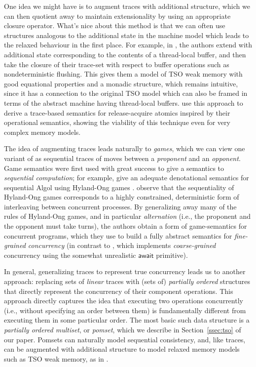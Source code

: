 \documentclass[acmsmall,screen,review]{acmart}
\newcommand{\ms}[1]{\ensuremath{\mathsf{#1}}}
\begin{document}
One idea we might have is to augment traces with additional structure, which we can then quotient
away to maintain extensionality by using an appropriate closure operator. What's nice about this
method is that we can often use structures analogous to the additional state in the machine model
which leads to the relaxed behaviour in the first place. For example, in
\citet{jagadeesan-brookes-relaxed-12}, the authors extend \citet{brookes-full-abstraction-96} with
additional state corresponding to the contents of a thread-local buffer, and then take the closure
of their trace-set with respect to buffer operations such as nondeterministic flushing. This gives
them a model of TSO weak memory with good equational properties and a monadic structure, which
remains intuitive, since it has a connection to the original TSO model which can also be framed in
terms of the abstract machine having thread-local buffers. \citet{release-acquire} use this approach
to derive a trace-based semantics for release-acquire atomics inspired by their operational
semantics, showing the viability of this technique even for very complex memory models.

The idea of augmenting traces leads naturally to \emph{games}, which we can view one variant of as
sequential traces of moves between a \emph{proponent} and an \emph{opponent}. Game semantics were
first used with great success to give a semantics to \emph{sequential computation}; for example,
\citet{abramsky-algol-96} give an adequate denotational semantics for sequential Algol using
Hyland-Ong games \cite{hyland-ong-00}. \citet{ghica-08} observe that the sequentiality of Hyland-Ong
games corresponds to a highly constrained, deterministic form of interleaving between concurrent
processes. By generalizing away many of the rules of Hyland-Ong games, and in particular
\emph{alternation} (i.e., the proponent and the opponent must take turns), the authors obtain a form
of game-semantics for concurrent programs, which they use to build a fully abstract semantics for
\emph{fine-grained concurrency} (in contrast to \citet{brookes-full-abstraction-96}, which
implements \emph{coarse-grained} concurrency using the somewhat unrealistic \ms{await} primitive).

In general, generalizing traces to represent true concurrency leads us to another approach:
replacing sets of \emph{linear} traces with (sets of) \emph{partially ordered} structures that
directly represent the concurrency of their component operations. This approach directly captures
the idea that executing two operations concurrently (i.e., without specifying an order between them)
is fundamentally different from executing them in some particular order. The most basic such data
structure is a \emph{partially ordered multiset}, or \emph{pomset}, which we describe in
Section~\ref{ssec:tso} of our paper. Pomsets can naturally model sequential consistency, and, like
traces, can be augmented with additional structure to model relaxed memory models such as TSO weak
memory, as in \citet{sparky}.
\end{document}
